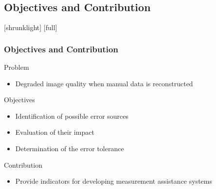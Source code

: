 \documentclass[12pt,compress,aspectratio=169]{beamer} %
\begin{document}
\subsection{Objectives and Contribution}
[shrunklight]
[full]
\begin{frame}[t]
	\frametitle{Objectives and Contribution}
	Problem
	\begin{itemize}
		\item Degraded image quality when manual data is reconstructed 
	\end{itemize}
	\vspace*{0.3cm}
	
	Objectives 	
	\begin{itemize}
		\item Identification of possible error sources
		\item Evaluation of their impact
		\item Determination of the error tolerance 
	\end{itemize}
	\vspace*{0.3cm}
	
	Contribution
	\begin{itemize}
		\item Provide indicators for developing measurement assistance systems
	\end{itemize}
\end{frame}

\end{document}
